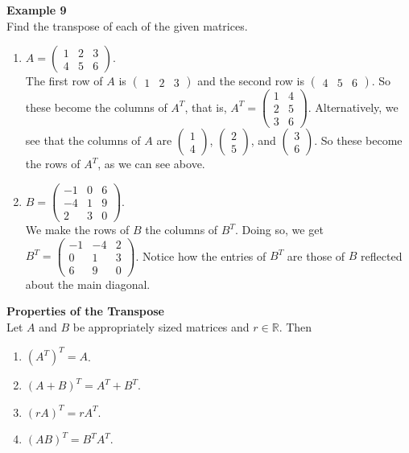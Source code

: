 \documentclass[12pt]{article}
\def\it{\item}
\def\be{\begin{enumerate}} \def\ee{\end{enumerate}}
\def\lp{\left(} \def\rp{\right)} \def\abs#1{\vert #1 \vert}
\def\R{\mathbb{R}} \def\Q{\mathbb{Q}} \def\N{\mathbb{N}} \def\Z{\mathbb{Z}} \def\P{\mathbb{P}}
\begin{document}
{\bf Example 9} \\
Find the transpose of each of the given matrices.
\be
\it $A = \begin{pmatrix} 1 & 2 & 3 \\ 4 & 5 & 6 \end{pmatrix}$. \\
 The first row of $A$ is $\begin{pmatrix} 1 & 2 & 3 \end{pmatrix}$ and the second row is $\begin{pmatrix} 4 & 5 & 6 \end{pmatrix}$. So these become the columns of $A^T$, that is, $A^T = \begin{pmatrix} 1 & 4 \\ 2 & 5 \\ 3 & 6 \end{pmatrix}$. Alternatively, we see that the columns of $A$ are $\begin{pmatrix} 1 \\ 4 \end{pmatrix}$, $\begin{pmatrix} 2 \\ 5 \end{pmatrix}$, and $\begin{pmatrix} 3 \\ 6 \end{pmatrix}$. So these become the rows of $A^T$, as we can see above.
\it $B = \lp \begin{array}{rrr} -1 & 0 & 6 \\ -4 & 1 & 9 \\ 2 & 3 & 0 \end{array} \rp$. \\
 We make the rows of $B$ the columns of $B^T$. Doing so, we get
$B^T = \lp \begin{array}{rrr} -1 & -4 & 2 \\ 0 & 1 & 3 \\ 6 & 9 & 0 \end{array} \rp$. Notice how the entries of $B^T$ are those of $B$ reflected about the main diagonal.
\ee

\begin{framed}
{\bf Properties of the Transpose} \\
Let $A$ and $B$ be appropriately sized matrices and $r \in \R$. Then
\be
\it $(A^T)^T = A$.
\it $(A + B)^T = A^T + B^T$.
\it $(rA)^T = rA^T$.
\it $(AB)^T = B^T A^T$.
\ee
\end{framed}
\end{document}
